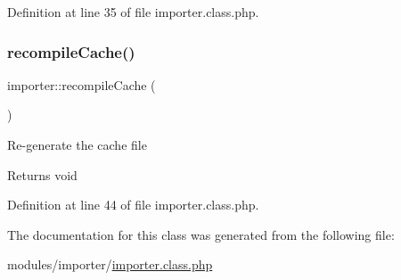 Definition at line 35 of file importer.\+class.\+php.

\mbox{\label{classimporter_a14049d84d0d3bb175857fc6e34447954}} 
\subsubsection{\texorpdfstring{recompile\+Cache()}{recompileCache()}}
{\footnotesize\ttfamily importer\+::recompile\+Cache (\begin{DoxyParamCaption}{ }\end{DoxyParamCaption})}

Re-\/generate the cache file \begin{DoxyReturn}{Returns}
void 
\end{DoxyReturn}


Definition at line 44 of file importer.\+class.\+php.



The documentation for this class was generated from the following file\+:\begin{DoxyCompactItemize}
\item 
modules/importer/\hyperlink{importer_8class_8php}{importer.\+class.\+php}\end{DoxyCompactItemize}
